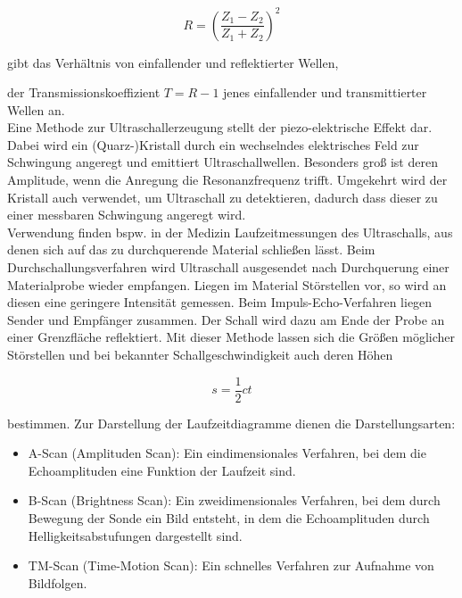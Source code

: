 \begin{equation}
    R = \left( \frac{Z_1 - Z_2}{Z_1 + Z_2} \right)^2
\end{equation}

gibt das Verhältnis von einfallender und reflektierter Wellen,

der Transmissionskoeffizient $T = R - 1$
jenes einfallender und transmittierter Wellen an. \\

Eine Methode zur Ultraschallerzeugung stellt der
piezo-elektrische Effekt dar. Dabei wird ein
(Quarz-)Kristall durch ein wechselndes
elektrisches Feld zur Schwingung angeregt und
emittiert Ultraschallwellen. Besonders groß
ist deren Amplitude, wenn die Anregung die 
Resonanzfrequenz trifft. Umgekehrt wird der
Kristall auch verwendet, um Ultraschall zu detektieren,
dadurch dass dieser zu einer messbaren Schwingung angeregt wird. \\

Verwendung finden bspw. in der Medizin Laufzeitmessungen des Ultraschalls,
aus denen sich auf das zu durchquerende Material schließen lässt.
Beim Durchschallungsverfahren wird Ultraschall ausgesendet nach
Durchquerung einer Materialprobe wieder empfangen.
Liegen im Material Störstellen vor, so wird an diesen
eine geringere Intensität gemessen.
Beim Impuls-Echo-Verfahren liegen Sender und
Empfänger zusammen. Der Schall wird dazu am Ende der Probe
an einer Grenzfläche reflektiert. Mit dieser Methode 
lassen sich die Größen möglicher Störstellen  und bei bekannter
Schallgeschwindigkeit auch deren Höhen 

\begin{equation}
    s = \frac{1}{2} c t
\end{equation}

bestimmen.
Zur Darstellung der Laufzeitdiagramme dienen die Darstellungsarten:

\begin{itemize}
    \item A-Scan (Amplituden Scan): Ein eindimensionales Verfahren, bei dem die 
    Echoamplituden eine Funktion der Laufzeit sind.
    \item B-Scan (Brightness Scan): Ein zweidimensionales Verfahren, bei dem
    durch Bewegung der Sonde ein Bild entsteht, in dem
    die Echoamplituden durch Helligkeitsabstufungen dargestellt sind. 
    \item TM-Scan (Time-Motion Scan): Ein schnelles Verfahren zur Aufnahme
    von Bildfolgen.
\end{itemize}










